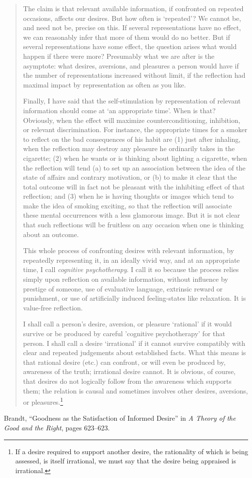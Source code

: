 \documentclass[letterpaper,11pt,twoside]{article}
\begin{document}
\begin{quotation}
    The claim is that relevant available information, if confronted on repeated occasions, affects our desires. But how often is `repeated'? We cannot be, and need not be, precise on this. If several representations have no effect, we can reasonably infer that more of them would do no better. But if several representations have some effect, the question arises what would happen if there were more? Presumably what we are after is the asymptote: what desires, aversions, and pleasures a person would have if the number of representations increased without limit, if the reflection had maximal impact by representation as often as you like.

    Finally, I have said that the self-stimulation by representation of relevant information should come at `an appropriate time'. When is that? Obviously, when the effect will maximize counterconditioning, inhibition, or relevant discrimination. For instance, the appropriate times for a smoker to reflect on the bad consequences of his habit are (1) just after inhaling, when the reflection may destroy any pleasure he ordinarily takes in the cigarette; (2) when he wants or is thinking about lighting a cigarette, when the reflection will tend (a) to set up an association between the idea of the state of affairs and contrary motivation, or (b) to make it clear that the total outcome will in fact not be pleasant with the inhibiting effect of that reflection; and (3) when he is having thoughts or images which tend to make the idea of smoking exciting, so that the reflection will associate these mental occurrences with a less glamorous image. But it is not clear that such reflections will be fruitless on any occasion when one is thinking about an outcome.

    This whole process of confronting desires with relevant information, by repeatedly representing it, in an ideally vivid way, and at an appropriate time, I call \emph{cognitive psychotherapy}. I call it so because the process relies simply upon reflection on available information, without influence by prestige of someone, use of evaluative language, extrinsic reward or punishment, or use of artificially induced feeling-states like relaxation. It is value-free reflection.

    I shall call a person's desire, aversion, or pleasure `rational' if it would survive or be produced by careful 'cognitive psychotherapy' for that person. I shall call a desire `irrational' if it cannot survive compatibly with clear and repeated judgements about established facts. What this means is that rational desire (etc.) can confront, or will even be produced by, awareness of the truth; irrational desire cannot. It is obvious, of course, that desires do not logically follow from the awareness which supports them; the relation is causal and sometimes involves other desires, aversions, or pleasures.\footnote[2]{If a desire required to support another desire, the rationality of which is being assessed, is itself irrational, we must say that the desire being appraised is irrational.}
  \end{quotation}
  \begin{flushright}
    Brandt, ``Goodness as the Satisfaction of Informed Desire'' in \emph{A Theory of the Good and the Right}, pages 623--623.
  \end{flushright}
\end{document}
